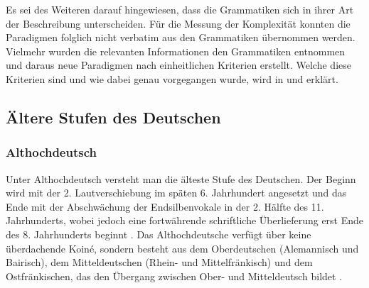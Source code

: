 Es sei des Weiteren darauf hingewiesen, dass die Grammatiken sich in ihrer Art der Beschreibung unterscheiden. Für die Messung der Komplexität konnten die Paradigmen folglich nicht verbatim aus den Grammatiken übernommen werden. Vielmehr wurden die relevanten Informationen den Grammatiken entnommen und daraus neue Paradigmen nach einheitlichen Kriterien erstellt. Welche diese Kriterien sind und wie dabei genau vorgegangen wurde, wird in  und  erklärt.

\subsection{Ältere Stufen des Deutschen}\label{3.3.1}
\subsubsection{Althochdeutsch}

Unter Althochdeutsch versteht man die älteste Stufe des Deutschen. Der Beginn wird mit der 2. Lautverschiebung im späten 6. Jahrhundert angesetzt und das Ende mit der Abschwächung der Endsilbenvokale in der 2. Hälfte des 11. Jahrhunderts, wobei jedoch eine fortwährende schriftliche Überlieferung erst Ende des 8. Jahrhunderts beginnt \citep[1]{Braune2004}. Das Althochdeutsche verfügt über keine überdachende Koiné, sondern besteht aus dem Oberdeutschen (Alemannisch und Bairisch), dem Mitteldeutschen (Rhein- und Mittelfränkisch) und dem Ostfränkischen, das den Übergang zwischen Ober- und Mitteldeutsch bildet \citep[1, 6]{Braune2004}.

